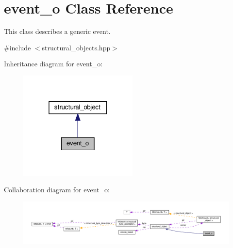 \hypertarget{classevent__o}{}\section{event\+\_\+o Class Reference}
\label{classevent__o}


This class describes a generic event.  




{\ttfamily \#include $<$structural\+\_\+objects.\+hpp$>$}



Inheritance diagram for event\+\_\+o\+:
\nopagebreak
\begin{figure}[H]
\begin{center}
\leavevmode
\includegraphics[width=169pt]{db/d6a/classevent__o__inherit__graph}
\end{center}
\end{figure}


Collaboration diagram for event\+\_\+o\+:
\nopagebreak
\begin{figure}[H]
\begin{center}
\leavevmode
\includegraphics[width=350pt]{d3/d05/classevent__o__coll__graph}
\end{center}
\end{figure}
